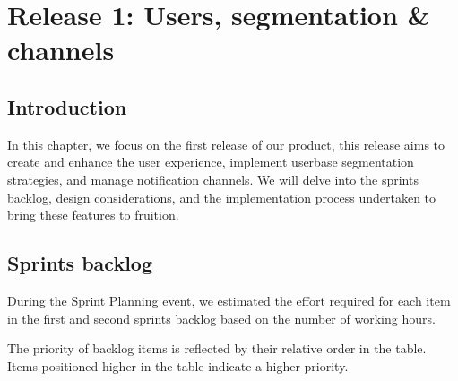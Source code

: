\chapter{Release 1: Users, segmentation \& channels}

\section*{Introduction}
In this chapter, we focus on the first release of our product, this release aims to create and enhance
the user experience, implement userbase segmentation strategies, and manage notification channels.
We will delve into the sprints backlog, design considerations, and the implementation process
undertaken to bring these features to fruition.


\section{Sprints backlog}
During the Sprint Planning event, we estimated the effort required for each item in the first and second
sprints backlog based on the number of working hours.

The priority of backlog items is reflected by their relative order in the table. Items positioned
higher in the table indicate a higher priority. \\

